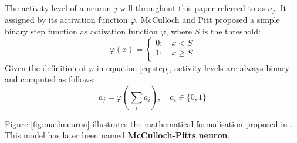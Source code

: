 \documentclass[10pt,a4paper,DIV=11]{scrreprt}
\begin{document}
The activity level of a neuron $j$ will throughout this paper referred to as $a_j$. It assigned by its activation function $\varphi$. 
McCulloch and Pitt proposed a simple binary step function as activation function $\varphi$, where $S$ is the threshold:\\

\begin{equation}
	\varphi(x)=\begin{cases}
		0: \quad  x < S \\
		1: \quad  x \geq S \\
	\end{cases}
\label{eq:step}
\end{equation}
Given the definition of $\varphi$ in equation \eqref{eq:step}, activity levels are always binary and computed as follows:\\

\begin{equation}
a_j = \varphi(\sum_{i}^{} a_{i}), \quad a_i \in \{0, 1\}
\end{equation}

Figure \ref{fig:mathneuron} illustrates the mathematical formalisation proposed in \cite{NEURONMATH}. This model has later been 
named \textbf{McCulloch-Pitts neuron}. 
\end{document}
